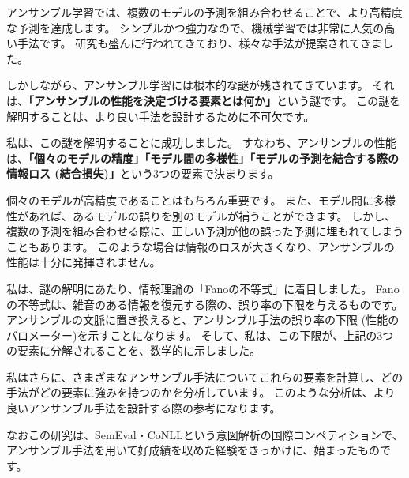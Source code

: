 アンサンブル学習では、複数のモデルの予測を組み合わせることで、より高精度な予測を達成します。
シンプルかつ強力なので、機械学習では非常に人気の高い手法です。
研究も盛んに行われてきており、様々な手法が提案されてきました。

しかしながら、アンサンブル学習には根本的な謎が残されてきています。
それは、\textbf{「アンサンブルの性能を決定づける要素とは何か」}という謎です。
この謎を解明することは、より良い手法を設計するために不可欠です。

私は、この謎を解明することに成功しました。
すなわち、アンサンブルの性能は、\textbf{「個々のモデルの精度」「モデル間の多様性」「モデルの予測を結合する際の情報ロス (結合損失)」}という3つの要素で決まります。

個々のモデルが高精度であることはもちろん重要です。
また、モデル間に多様性があれば、あるモデルの誤りを別のモデルが補うことができます。
しかし、複数の予測を組み合わせる際に、正しい予測が他の誤った予測に埋もれてしまうこともあります。
このような場合は情報のロスが大きくなり、アンサンブルの性能は十分に発揮されません。

私は、謎の解明にあたり、情報理論の「Fanoの不等式」に着目しました。
Fanoの不等式は、雑音のある情報を復元する際の、誤り率の下限を与えるものです。
アンサンブルの文脈に置き換えると、アンサンブル手法の誤り率の下限 (性能のバロメーター)を示すことになります。
そして、私は、この下限が、上記の3つの要素に分解されることを、数学的に示しました。

私はさらに、さまざまなアンサンブル手法についてこれらの要素を計算し、どの手法がどの要素に強みを持つのかを分析しています。
このような分析は、より良いアンサンブル手法を設計する際の参考になります。

なおこの研究は、SemEval・CoNLLという意図解析の国際コンペティションで、アンサンブル手法を用いて好成績を収めた経験をきっかけに、始まったものです。

